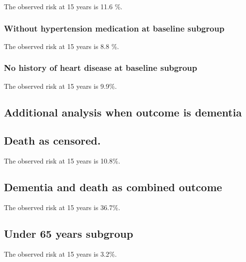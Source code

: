 \documentclass[
]{book}
\begin{document}
The observed risk at 15 years is 11.6 \%.

\hypertarget{without-hypertension-medication-at-baseline-subgroup}{%
\subsubsection{Without hypertension medication at baseline subgroup}\label{without-hypertension-medication-at-baseline-subgroup}}

The observed risk at 15 years is 8.8 \%.

\hypertarget{no-history-of-heart-disease-at-baseline-subgroup}{%
\subsubsection{No history of heart disease at baseline subgroup}\label{no-history-of-heart-disease-at-baseline-subgroup}}

The observed risk at 15 years is 9.9\%.

\hypertarget{additional-analysis-when-outcome-is-dementia}{%
\subsection{Additional analysis when outcome is dementia}\label{additional-analysis-when-outcome-is-dementia}}

\hypertarget{death-as-censored.}{%
\subsection{Death as censored.}\label{death-as-censored.}}

The observed risk at 15 years is 10.8\%.

\hypertarget{dementia-and-death-as-combined-outcome}{%
\subsection{Dementia and death as combined outcome}\label{dementia-and-death-as-combined-outcome}}

The observed risk at 15 years is 36.7\%.

\hypertarget{under-65-years-subgroup-1}{%
\subsection{Under 65 years subgroup}\label{under-65-years-subgroup-1}}

The observed risk at 15 years is 3.2\%.
\end{document}
